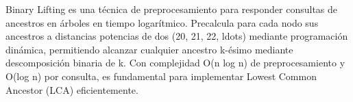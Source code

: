 \markdownRendererDocumentBegin
\markdownRendererSectionBegin
{}\markdownRendererInterblockSeparator
{}Binary Lifting es una técnica de preprocesamiento para responder consultas de ancestros en árboles en tiempo logarítmico. Precalcula para cada nodo sus ancestros a distancias potencias de dos (\markdownRendererDollarSign{}2\markdownRendererCircumflex{}\markdownRendererLeftBrace{}0\markdownRendererRightBrace{}\markdownRendererDollarSign{}, \markdownRendererDollarSign{}2\markdownRendererCircumflex{}\markdownRendererLeftBrace{}1\markdownRendererRightBrace{}\markdownRendererDollarSign{}, \markdownRendererDollarSign{}2\markdownRendererCircumflex{}\markdownRendererLeftBrace{}2\markdownRendererRightBrace{}\markdownRendererDollarSign{}, \markdownRendererBackslash{}ldots) mediante programación dinámica, permitiendo alcanzar cualquier ancestro k-ésimo mediante descomposición binaria de k. Con complejidad \markdownRendererDollarSign{}O(n \markdownRendererBackslash{}log n)\markdownRendererDollarSign{} de preprocesamiento y \markdownRendererDollarSign{}O(\markdownRendererBackslash{}log n)\markdownRendererDollarSign{} por consulta, es fundamental para implementar Lowest Common Ancestor (LCA) eficientemente.\markdownRendererInterblockSeparator
{}
\markdownRendererSectionEnd \markdownRendererDocumentEnd